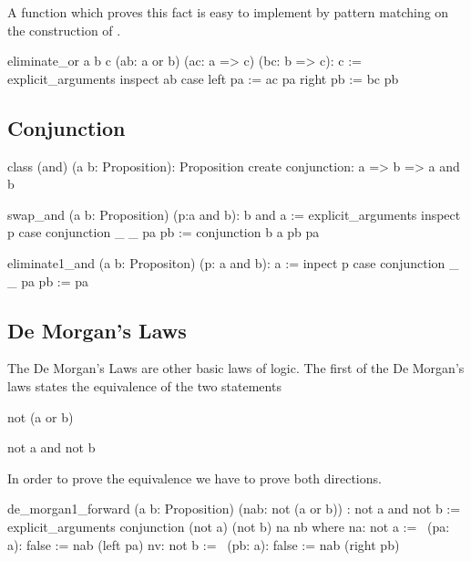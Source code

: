 A function which proves this fact is easy to implement by pattern matching on
the construction of .

\begin{alba}
  eliminate_or a b c (ab: a or b) (ac: a => c) (bc: b => c): c :=
    explicit_arguments
      inspect
        ab
      case
        left  pa :=
          ac pa
        right pb :=
          bc pb
\end{alba}


\subsection{Conjunction}

\begin{alba}
  class
    (and) (a b: Proposition): Proposition
  create
    conjunction: a => b => a and b
\end{alba}


\begin{alba}
  swap_and (a b: Proposition) (p:a and b): b and a :=
    explicit_arguments
      inspect
        p
      case
        conjunction _ _ pa pb := conjunction b a pb pa
\end{alba}


\begin{alba}
  eliminate1_and (a b: Propositon) (p: a and b): a :=
    inpect p case
      conjunction _ _ pa pb := pa
\end{alba}



\subsection{De Morgan's Laws}

The De Morgan's Laws are other basic laws of logic. The first of the De
Morgan's laws states the equivalence of the two statements
\begin{alba}
  not (a or b)

  not a and not b
\end{alba}
%
In order to prove the equivalence we have to prove both directions.
\begin{alba}
  de_morgan1_forward
    (a b: Proposition)
    (nab: not (a or b))
    : not a and not b :=
      explicit_arguments
        conjunction (not a) (not b) na nb where
          na: not a :=
             \ (pa: a): false :=
                nab (left pa)
          nv: not b :=
             \ (pb: a): false :=
                nab (right pb)
\end{alba}

